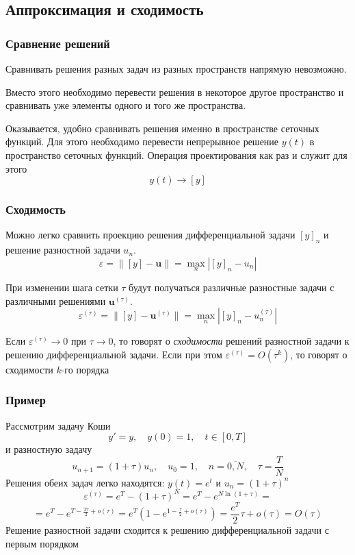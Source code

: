 \documentclass[apectratio=43,unicode]{beamer}
\begin{document}
\subsection{Аппроксимация и сходимость}
\begin{frame}\frametitle{Сравнение решений}
	Сравнивать решения разных задач из разных пространств напрямую невозможно.

	Вместо этого необходимо перевести решения в некоторое другое пространство и сравнивать уже элементы
	одного и того же пространства.
	\pause

	Оказывается, удобно сравнивать решения именно в пространстве сеточных функций. Для этого необходимо перевести
	непрерывное решение $y(t)$ в пространство сеточных функций. Операция проектирования как раз и служит для этого
	$$
	y(t) \rightarrow [y]
	$$
\end{frame}

\begin{frame}\frametitle{Сходимость}
	Можно легко сравнить проекцию решения дифференциальной задачи $[y]_n$ и решение разностной задачи $u_n$. 
	$$
	\varepsilon = \|[y] - \mathbf{u}\| = \max_n |[y]_n - u_n|
	$$

	При изменении шага сетки $\tau$ будут получаться различные разностные задачи 
	с различными решениями $\mathbf{u}^{(\tau)}$. 
	$$
	\varepsilon^{(\tau)} = \|[y] - \mathbf{u}^{(\tau)}\| = \max_n |[y]_n - u_n^{(\tau)}|
	$$
	
	Если $\varepsilon^{(\tau)} \rightarrow 0$ при $\tau \rightarrow 0$, то говорят о \emph{сходимости} решений 
	разностной задачи к решению дифференциальной задачи. Если при этом $\varepsilon^{(\tau)} = O(\tau^k)$, 
	то говорят о сходимости $k$-го порядка
\end{frame}

\begin{frame}\frametitle{Пример}
	Рассмотрим задачу Коши
	$$
		y' = y, \quad y(0) = 1, \quad t \in [0, T]
	$$
	и разностную задачу
	$$
		u_{n+1} = (1 + \tau) u_n, \quad u_0 = 1, \quad n = \overline{0,N}, \quad \tau = \frac{T}{N}
	$$
	Решения обеих задач легко находятся: $y(t) = e^t$ и $u_n = \left(1+\tau\right)^n$
	$$
	\varepsilon^{(\tau)} = e^T - \left(1 + \tau\right)^N = e^T - e^{N \ln \left(1+\tau\right)} = 
	$$
	$$
	= e^T - e^{T - \frac{T\tau}{2} + o\left(\tau\right)} = e^T \left(1 - e^{1-\frac{\tau}{2}+o(\tau)} \right) = 
	\frac{e^T}{2}\tau + o(\tau) = O(\tau)
	$$
	Решение разностной задачи сходится к решению дифференциальной задачи с первым порядком
\end{frame}
\end{document}
